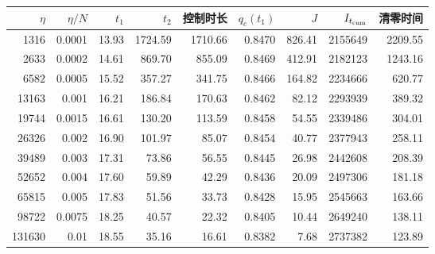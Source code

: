 {\setlength{\tabcolsep}{3pt}
\begin{tabular}{@{}rrrrrrrrr@{}}
\toprule
$\eta$ & $\eta/N$ & $t_1$ & $t_2$ & 控制时长 & $q_c(t_1)$ & $J$ & $I_{t_{\mathrm{cum}}}$ & 清零时间 \\
\midrule
1316 & 0.0001 & 13.93 & 1724.59 & 1710.66 & 0.8470 & 826.41 & 2155649 & 2209.55 \\
2633 & 0.0002 & 14.61 & 869.70 & 855.09 & 0.8469 & 412.91 & 2182123 & 1243.16 \\
6582 & 0.0005 & 15.52 & 357.27 & 341.75 & 0.8466 & 164.82 & 2234666 & 620.77 \\
13163 & 0.001 & 16.21 & 186.84 & 170.63 & 0.8462 & 82.12 & 2293939 & 389.32 \\
19744 & 0.0015 & 16.61 & 130.20 & 113.59 & 0.8458 & 54.55 & 2339486 & 304.01 \\
26326 & 0.002 & 16.90 & 101.97 & 85.07 & 0.8454 & 40.77 & 2377943 & 258.11 \\
39489 & 0.003 & 17.31 & 73.86 & 56.55 & 0.8445 & 26.98 & 2442608 & 208.39 \\
52652 & 0.004 & 17.60 & 59.89 & 42.29 & 0.8436 & 20.09 & 2497306 & 181.18 \\
65815 & 0.005 & 17.83 & 51.56 & 33.73 & 0.8428 & 15.95 & 2545663 & 163.66 \\
98722 & 0.0075 & 18.25 & 40.57 & 22.32 & 0.8405 & 10.44 & 2649240 & 138.11 \\
131630 & 0.01 & 18.55 & 35.16 & 16.61 & 0.8382 & 7.68 & 2737382 & 123.89 \\
\bottomrule
\end{tabular}}

